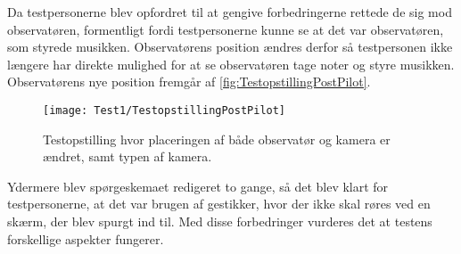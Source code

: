 Da testpersonerne blev opfordret til at gengive forbedringerne rettede de sig mod observatøren, formentligt fordi testpersonerne kunne se at det var observatøren, som styrede musikken. Observatørens position ændres derfor så testpersonen ikke længere har direkte mulighed for at se observatøren tage noter og styre musikken. Observatørens nye position fremgår af \autoref{fig:TestopstillingPostPilot}. 
%
\begin{figure}[H]
	\centering
	\texttt{[image: Test1/TestopstillingPostPilot]}
	\caption{Testopstilling hvor placeringen af både observatør og kamera er ændret, samt typen af kamera.}
	\label{fig:TestopstillingPostPilot}
\end{figure}
\noindent
% 
Ydermere blev spørgeskemaet redigeret to gange, så det blev klart for testpersonerne, at det var brugen af gestikker, hvor der ikke skal røres ved en skærm, der blev spurgt ind til. \blankline
%
Med disse forbedringer vurderes det at testens forskellige aspekter fungerer.  
 


